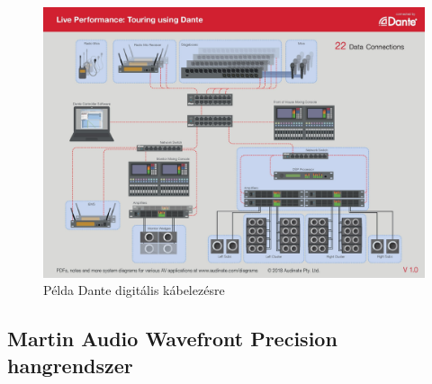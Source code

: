 \begin{figure}[H]
	\centering
	\includegraphics[width=\linewidth, keepaspectratio]{figures/live-dante.jpg}
	\caption{Példa Dante digitális kábelezésre~\cite{APPLICATIONDIAGRAMSFORDANTESYSTEMS}}\label{fig:live-dante}
\end{figure}
\subsection{Martin Audio Wavefront Precision hangrendszer}
